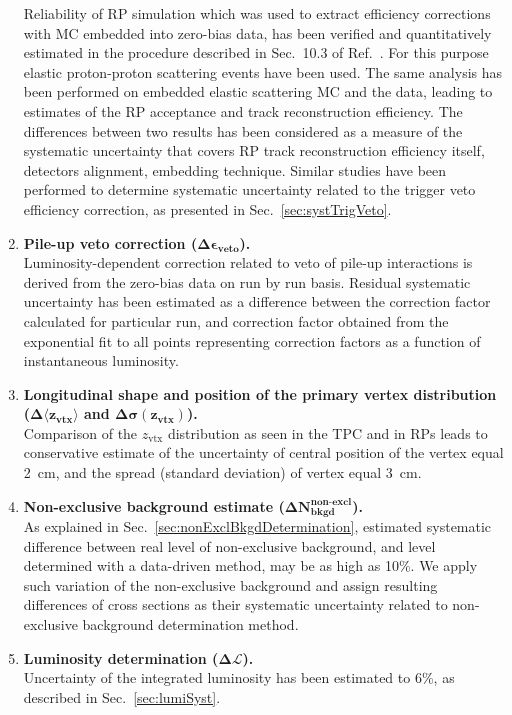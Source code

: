 \begin{enumerate}
 Reliability of RP simulation which was used to extract efficiency corrections with MC embedded into zero-bias data, has been verified and quantitatively estimated in the procedure described in Sec.~10.3 of Ref.~\cite{supplementaryNote}. For this purpose elastic proton-proton scattering events have been used. The same analysis has been performed on embedded elastic scattering MC and the data, leading to estimates of the RP acceptance and track reconstruction efficiency. The differences between two results has been considered as a measure of the systematic uncertainty that covers RP track reconstruction efficiency itself, detectors alignment, embedding technique. Similar studies have been performed to determine systematic uncertainty related to the trigger veto efficiency correction, as presented in Sec.~\ref{sec:systTrigVeto}.
 \item \textbf{Pile-up veto correction ($\bm{\Delta\epsilon_{\text{veto}}}$).}\\
 Luminosity-dependent correction related to veto of pile-up interactions is derived from the zero-bias data on run by run basis. Residual systematic uncertainty has been estimated as a difference between the correction factor calculated for particular run, and correction factor obtained from the exponential fit to all points representing correction factors as a function of instantaneous luminosity.
 \item \textbf{Longitudinal shape and position of the primary vertex distribution ($\bm{\Delta\langle z_{\text{vtx}}\rangle}$ and $\bm{\Delta\sigma( z_{\text{vtx}})}$).}\\
 Comparison of the $z_{\text{vtx}}$ distribution as seen in the TPC and in RPs leads to conservative estimate of the uncertainty of central position of the vertex equal 2~cm, and the spread (standard deviation) of vertex equal 3~cm.
 \item \textbf{Non-exclusive background estimate ($\bm{\Delta N_{\text{bkgd}}^{\text{non-excl}}}$).}\\
 As explained in Sec.~\ref{sec:nonExclBkgdDetermination}, estimated systematic difference between real level of non-exclusive background, and level determined with a data-driven method, may be as high as 10\%. We apply such variation of the non-exclusive background and assign resulting differences of cross sections as their systematic uncertainty related to non-exclusive background determination method.
 \item \textbf{Luminosity determination ($\bm{\Delta\mathcal{L}}$).}\\
 Uncertainty of the integrated luminosity has been estimated to 6\%, as described in Sec.~\ref{sec:lumiSyst}.
\end{enumerate}

